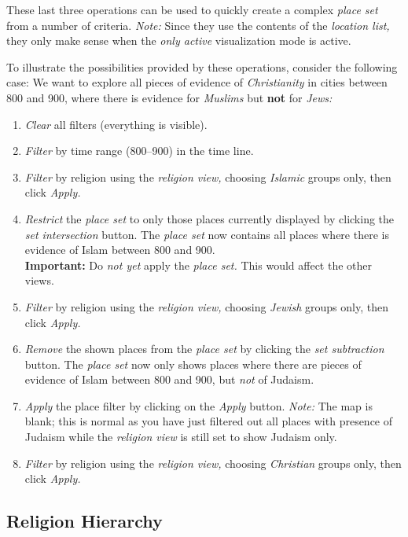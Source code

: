 These last three operations can be used to quickly create a complex \emph{place set} from a number of criteria.
\emph{Note:} Since they use the contents of the \emph{location list,} they only make sense when the \emph{only active} visualization mode is active.

To illustrate the possibilities provided by these operations, consider the following case:
We want to explore all pieces of evidence of \emph{Christianity} in cities between 800 and 900, where there is evidence for \emph{Muslims} but \textbf{not} for \emph{Jews:}

\begin{enumerate}
  \item \emph{Clear} all filters (everything is visible).
  \item \emph{Filter} by time range (800--900) in the time line.
  \item \emph{Filter} by religion using the \emph{religion view,} choosing \emph{Islamic} groups only, then click \emph{Apply.}
  \item
    \emph{Restrict} the \emph{place set} to only those places currently displayed by clicking the \emph{set intersection} button.
    The \emph{place set} now contains all places where there is evidence of Islam between 800 and 900.\\
    \textbf{Important:} Do \emph{not yet} apply the \emph{place set.}
    This would affect the other views.
  \item \emph{Filter} by religion using the \emph{religion view,} choosing \emph{Jewish} groups only, then click \emph{Apply.}
  \item
    \emph{Remove} the shown places from the \emph{place set} by clicking the \emph{set subtraction} button.
    The \emph{place set} now only shows places where there are pieces of evidence of Islam between 800 and 900, but \emph{not} of Judaism.
  \item
    \emph{Apply} the place filter by clicking on the \emph{Apply} button.
    \emph{Note:} The map is blank;
    this is normal as you have just filtered out all places with presence of Judaism while the \emph{religion view} is still set to show Judaism only.
  \item \emph{Filter} by religion using the \emph{religion view,} choosing \emph{Christian} groups only, then click \emph{Apply.}
\end{enumerate}


\subsection{Religion Hierarchy}
\label{sec:religion-hierarchy}

